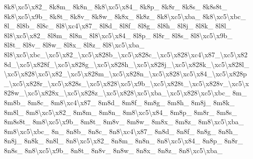 {8k8\textbackslash{}xc5\textbackslash{}x82\-\_\- 8k8m\-\_\- 8k8n\-\_\- 8k8\textbackslash{}xc5\textbackslash{}x84\-\_\- 8k8p\-\_\- 8k8r\-\_\- 8k8s\-\_\- 8k8s8t\-\_\- 8k8\textbackslash{}xc5\textbackslash{}x9b\-\_\- 8k8t\-\_\- 8k8v\-\_\- 8k8w\-\_\- 8k8x\-\_\- 8k8z\-\_\- 8k8\textbackslash{}xc5\textbackslash{}xba\-\_\- 8k8\textbackslash{}xc5\textbackslash{}xbc\-\_\- 8l\-\_\- 8l8b\-\_\- 8l8c\-\_\- 8l8\textbackslash{}xc4\textbackslash{}x87\-\_\- 8l8d\-\_\- 8l8f\-\_\- 8l8g\-\_\- 8l8h\-\_\- 8l8j\-\_\- 8l8k\-\_\- 8l8l\-\_\- 8l8\textbackslash{}xc5\textbackslash{}x82\-\_\- 8l8m\-\_\- 8l8n\-\_\- 8l8\textbackslash{}xc5\textbackslash{}x84\-\_\- 8l8p\-\_\- 8l8r\-\_\- 8l8s\-\_\- 8l8\textbackslash{}xc5\textbackslash{}x9b\-\_\- 8l8t\-\_\- 8l8v\-\_\- 8l8w\-\_\- 8l8x\-\_\- 8l8z\-\_\- 8l8\textbackslash{}xc5\textbackslash{}xba\-\_\- 8l8\textbackslash{}xc5\textbackslash{}xbc\-\_\textbackslash{}xc5\textbackslash{}x82\-\_\textbackslash{}xc5\textbackslash{}x828b\-\_\textbackslash{}xc5\textbackslash{}x828c\-\_\textbackslash{}xc5\textbackslash{}x828\textbackslash{}xc4\textbackslash{}x87\-\_\textbackslash{}xc5\textbackslash{}x828d\-\_\textbackslash{}xc5\textbackslash{}x828f\-\_\textbackslash{}xc5\textbackslash{}x828g\-\_\textbackslash{}xc5\textbackslash{}x828h\-\_\textbackslash{}xc5\textbackslash{}x828j\-\_\textbackslash{}xc5\textbackslash{}x828k\-\_\textbackslash{}xc5\textbackslash{}x828l\-\_\textbackslash{}xc5\textbackslash{}x828\textbackslash{}xc5\textbackslash{}x82\-\_\textbackslash{}xc5\textbackslash{}x828m\-\_\textbackslash{}xc5\textbackslash{}x828n\-\_\textbackslash{}xc5\textbackslash{}x828\textbackslash{}xc5\textbackslash{}x84\-\_\textbackslash{}xc5\textbackslash{}x828p\-\_\textbackslash{}xc5\textbackslash{}x828r\-\_\textbackslash{}xc5\textbackslash{}x828s\-\_\textbackslash{}xc5\textbackslash{}x828\textbackslash{}xc5\textbackslash{}x9b\-\_\textbackslash{}xc5\textbackslash{}x828t\-\_\textbackslash{}xc5\textbackslash{}x828v\-\_\textbackslash{}xc5\textbackslash{}x828w\-\_\textbackslash{}xc5\textbackslash{}x828x\-\_\textbackslash{}xc5\textbackslash{}x828z\-\_\textbackslash{}xc5\textbackslash{}x828\textbackslash{}xc5\textbackslash{}xba\-\_\textbackslash{}xc5\textbackslash{}x828\textbackslash{}xc5\textbackslash{}xbc\-\_\- 8m\-\_\- 8m8b\-\_\- 8m8c\-\_\- 8m8\textbackslash{}xc4\textbackslash{}x87\-\_\- 8m8d\-\_\- 8m8f\-\_\- 8m8g\-\_\- 8m8h\-\_\- 8m8j\-\_\- 8m8k\-\_\- 8m8l\-\_\- 8m8\textbackslash{}xc5\textbackslash{}x82\-\_\- 8m8m\-\_\- 8m8n\-\_\- 8m8\textbackslash{}xc5\textbackslash{}x84\-\_\- 8m8p\-\_\- 8m8r\-\_\- 8m8s\-\_\- 8m8s8t\-\_\- 8m8\textbackslash{}xc5\textbackslash{}x9b\-\_\- 8m8t\-\_\- 8m8v\-\_\- 8m8w\-\_\- 8m8x\-\_\- 8m8z\-\_\- 8m8\textbackslash{}xc5\textbackslash{}xba\-\_\- 8m8\textbackslash{}xc5\textbackslash{}xbc\-\_\- 8n\-\_\- 8n8b\-\_\- 8n8c\-\_\- 8n8\textbackslash{}xc4\textbackslash{}x87\-\_\- 8n8d\-\_\- 8n8f\-\_\- 8n8g\-\_\- 8n8h\-\_\- 8n8j\-\_\- 8n8k\-\_\- 8n8l\-\_\- 8n8\textbackslash{}xc5\textbackslash{}x82\-\_\- 8n8m\-\_\- 8n8n\-\_\- 8n8\textbackslash{}xc5\textbackslash{}x84\-\_\- 8n8p\-\_\- 8n8r\-\_\- 8n8s\-\_\- 8n8\textbackslash{}xc5\textbackslash{}x9b\-\_\- 8n8t\-\_\- 8n8v\-\_\- 8n8w\-\_\- 8n8x\-\_\- 8n8z\-\_\- 8n8\textbackslash{}xc5\textbackslash{}xba\-\_\- }

